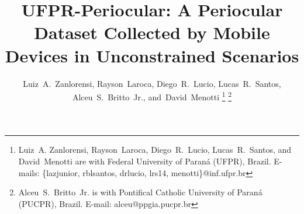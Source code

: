 \documentclass[journal]{IEEEtran}
\begin{document}
\title{UFPR-Periocular: A Periocular Dataset Collected by Mobile Devices in Unconstrained Scenarios}


\author{Luiz~A.~Zanlorensi,
        Rayson~Laroca,
        Diego~R.~Lucio,
        Lucas~R.~Santos,
        Alceu~S.~Britto~Jr.,
        and~David~Menotti
\thanks{Luiz~A. Zanlorensi, Rayson~Laroca, Diego~R.~Lucio, Lucas~R.~Santos, and David~Menotti are with Federal University of Paraná (UFPR), Brazil.
E-mails: \{lazjunior, rblsantos, drlucio, lrs14, menotti\}@inf.ufpr.br}
\thanks{Alceu~S.~Britto~Jr. is with Pontifical Catholic University of Paraná (PUCPR), Brazil.
E-mail: alceu@ppgia.pucpr.br}}

\maketitle

\newcommand{\upol}{UPOL\xspace}
\newcommand{\ubirisvOne}{UBIRIS.v1\xspace}
\newcommand{\utiris}{UTIRIS\xspace}
\newcommand{\ubirisvTwo}{UBIRIS.v2\xspace}
\newcommand{\ubipr}{UBIPr\xspace}
\newcommand{\bdcp}{BDCP\xspace}
\newcommand{\iiitdMSP}{IIITD Multi-spectral Periocular\xspace}
\newcommand{\polyu}{PolyU Cross-Spectral\xspace}
\newcommand{\miche}{MICHE-I\xspace}
\newcommand{\vssiris}{VSSIRIS\xspace}
\newcommand{\csip}{CSIP\xspace}
\newcommand{\visob}{VISOB\xspace}
\newcommand{\crossEyed}{CROSS-EYED\xspace}
\newcommand{\qutMP}{QUT Multispectral Periocular\xspace} \newcommand{\urldataset}{https://web.inf.ufpr.br/vri/databases/ufpr-periocular/} 
\end{document}
